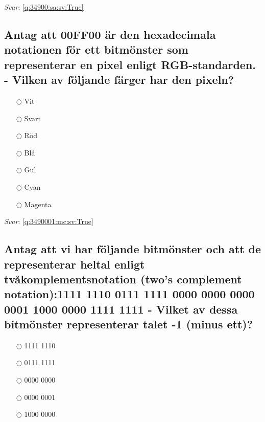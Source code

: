 \documentclass[a4paper,11pt,oneside]{article}
\begin{document}
\begin{sloppypar}
\label{q:34900:sa:sv:False}

\vspace{2cm}

\noindent\makebox[\textwidth]{\hrulefill}

\vspace{1cm}

\textit{Svar}: \autoref{q:34900:sa:sv:True}

\subsection{Antag att 00FF00 \"ar den hexadecimala notationen f\"or ett bitm\"onster som representerar en pixel enligt RGB-standarden. - Vilken av f\"oljande f\"arger har den pixeln?}

\label{q:3490001:mc:sv:False}

\begin{itemize}
  \item[$\bigcirc$] Vit
  \item[$\bigcirc$] Svart
  \item[$\bigcirc$] R\"od
  \item[$\bigcirc$] Bl\r{a}
  \item[$\bigcirc$] Gul
  \item[$\bigcirc$] Cyan
  \item[$\bigcirc$] Magenta
\end{itemize}

\vspace{1cm}

\textit{Svar}: \autoref{q:3490001:mc:sv:True}



\subsection{Antag att vi har f\"oljande bitm\"onster och att de representerar heltal enligt tv\r{a}komplementsnotation (two{\textquoteright}s complement notation):1111 1110 0111 1111 0000 0000 0000 0001 1000 0000 1111 1111 - Vilket av dessa bitm\"onster representerar talet -1 (minus ett)?}

\label{q:35000:mc:sv:False}

\begin{itemize}
  \item[$\bigcirc$] 1111 1110
  \item[$\bigcirc$] 0111 1111
  \item[$\bigcirc$] 0000 0000
  \item[$\bigcirc$] 0000 0001
  \item[$\bigcirc$] 1000 0000
\end{itemize}


\end{sloppypar}
\end{document}
